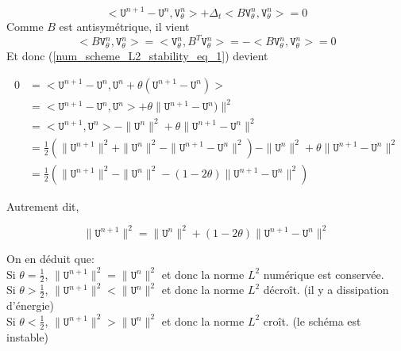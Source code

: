 \documentclass[12pt,a4paper]{article}
\numberwithin{equation}{section}
\begin{document}
\begin{equation}
    <\texttt{U}^{n+1}- \texttt{U}^n, \texttt{V}^n_\theta >+ \Delta_t < B\texttt{V}^n_\theta , \texttt{V}^n_\theta  > = 0 \label{num_scheme_L2_stability_eq_1}
\end{equation}
Comme $B$ est antisymétrique, il vient 
$$< B\texttt{V}^n_\theta , \texttt{V}^n_\theta  > = < \texttt{V}^n_\theta , B^T\texttt{V}^n_\theta  > = -< B\texttt{V}^n_\theta , \texttt{V}^n_\theta  > = 0$$
Et donc (\ref{num_scheme_L2_stability_eq_1}) devient

\begin{equation}
\begin{split}
    0  &=   <\texttt{U}^{n+1}- \texttt{U}^n, \texttt{U}^{n} + \theta(\texttt{U}^{n+1}  - \texttt{U}^{n})> 
    \\ &=   <\texttt{U}^{n+1}- \texttt{U}^n, \texttt{U}^{n}>  + \theta\|\texttt{U}^{n+1}  - \texttt{U}^{n})\|^2
    \\ &=   <\texttt{U}^{n+1}, \texttt{U}^{n}>-  \|\texttt{U}^{n}\|^2 + \theta\|\texttt{U}^{n+1}  - \texttt{U}^{n}\|^2
    \\ &=   \frac{1}{2}\left(\|\texttt{U}^{n+1}\|^2+ \|\texttt{U}^n\|^2 - \|\texttt{U}^{n+1}- \texttt{U}^n\|^2\right)-  \|\texttt{U}^{n}\|^2 + \theta\|\texttt{U}^{n+1}  - \texttt{U}^{n}\|^2
    \\ &=   \frac{1}{2}\left(\|\texttt{U}^{n+1}\|^2 - \|\texttt{U}^n\|^2 - (1 - 2\theta) \|\texttt{U}^{n+1}-  \texttt{U}^{n}\|^2 \right)
\end{split}
\end{equation}

Autrement dit, 

\begin{equation}
    \|\texttt{U}^{n+1}\|^2 = \|\texttt{U}^n\|^2 + (1 - 2\theta) \|\texttt{U}^{n+1}-  \texttt{U}^{n}\|^2
\end{equation}

On en déduit que:\\

Si $\theta = \frac{1}{2}$, $\|\texttt{U}^{n+1}\|^2 = \|\texttt{U}^n\|^2$ et donc la norme $L^2$ numérique est conservée.\\

Si $\theta > \frac{1}{2}$, $\|\texttt{U}^{n+1}\|^2 < \|\texttt{U}^n\|^2$ et donc la norme $L^2$ décroît. (il y a dissipation d'énergie)\\

Si $\theta < \frac{1}{2}$, $\|\texttt{U}^{n+1}\|^2 > \|\texttt{U}^n\|^2$ et donc la norme $L^2$ croît. (le schéma est instable)\\
\end{document}
